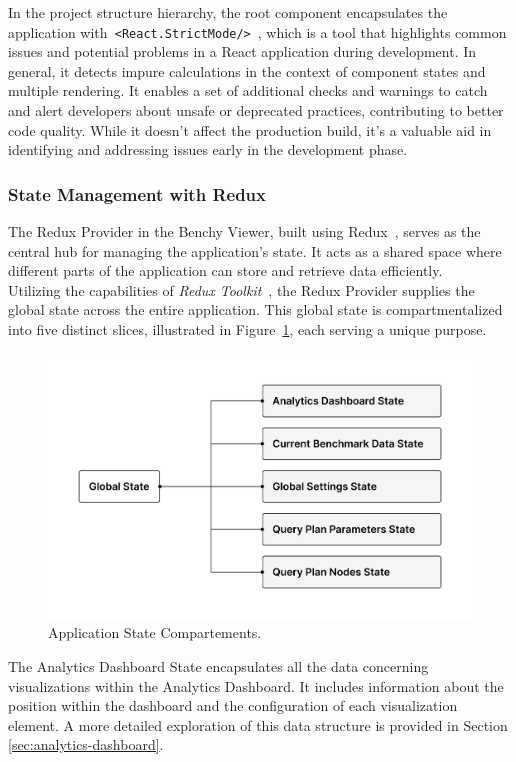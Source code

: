 In the project structure hierarchy, the root component encapsulates the application with\texttt{ <React.StrictMode/>}~\parencite{reactstrictmode}, which is a tool that highlights common issues and potential problems in a React application during development.
In general, it detects impure calculations in the context of component states and multiple rendering. It enables a set of additional checks and warnings to catch and alert developers about unsafe or deprecated practices, contributing to better code quality. While it doesn't affect the production build, it's a valuable aid in identifying and addressing issues early in the development phase.


\subsubsection{State Management with Redux}
The Redux Provider in the Benchy Viewer, built using Redux~\parencite{Redux}, serves as the central hub for managing the application's state. It acts as a shared space where different parts of the application can store and retrieve data efficiently.\\
Utilizing the capabilities of \textit{Redux Toolkit}~\parencite{redux-toolkit}, the Redux Provider supplies the global state across the entire application. This global state is compartmentalized into five distinct slices, illustrated in Figure~\ref{fig:global-state}, each serving a unique purpose.

\begin{figure}[h]
  \centering
  \includegraphics[width=0.8\linewidth]{figures/global-state.png}
  \caption{Application State Compartements.}
  \label{fig:global-state}
\end{figure}

The Analytics Dashboard State encapsulates all the data concerning visualizations within the Analytics Dashboard. It includes information about the position within the dashboard and the configuration of each visualization element. A more detailed exploration of this data structure is provided in Section \ref{sec:analytics-dashboard}.

